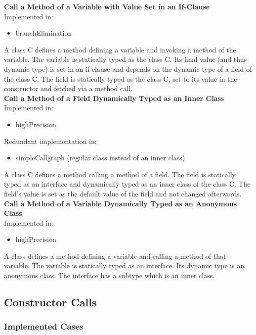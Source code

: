\documentclass{article}
\begin{document}
\noindent
\textbf{Call a Method of a Variable with Value Set in an If-Clause}\\
Implemented in: 
\begin{itemize}
    \item branchElimination
\end{itemize}
A class C defines a method defining a variable and invoking a method of the variable. The variable is statically typed as the class C. Its final value (and thus dynamic type) is set in an if-clause and depends on the dynamic type of a field of the class C. The field is statically typed as the class C, set to its value in the constructor and fetched via a method call.\\

\noindent
\textbf{Call a Method of a Field Dynamically Typed as an Inner Class}\\
Implemented in: 
\begin{itemize}
    \item highPrecision
\end{itemize}
Redundant implementation in: 
\begin{itemize}
    \item simpleCallgraph (regular class instead of an inner class)
\end{itemize}
A class C defines a method calling a method of a field. The field is statically typed as an interface and dynamically typed as an inner class of the class C. The field's value is set as the default value of the field and not changed afterwards.\\

\noindent
\textbf{Call a Method of a Variable Dynamically Typed as an Anonymous Class}\\
Implemented in: 
\begin{itemize}
    \item highPrecision
\end{itemize}
A class defines a method defining a variable and calling a method of that variable. The variable is statically typed as an interface. Its dynamic type is an anonymous class. The interface has a subtype which is an inner class.\\


\subsection{Constructor Calls}
\subsubsection{Implemented Cases}
\end{document}
